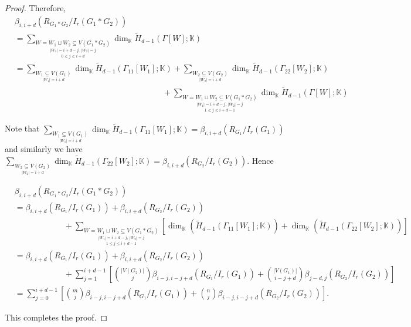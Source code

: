 \documentclass[10pt,a4paper]{amsart}
\newcommand{\K}{\mathbb K}
\begin{document}
\begin{proof}
\noindent
    Therefore,
    {\footnotesize
    \begin{align*}
       &\beta_{i,i+d}(R_{G_1*G_2}/I_r(G_1*G_2))\\
       &=\sum_{\underset{0\le j\le i+d}{\underset{|W_1|=i+d-j,\,|W_2|=j}{W=W_1\sqcup W_2 \subseteq V(G_1*G_2) }}} \dim_{\mathbb{K}} \widetilde{H}_{d-1}(\Gamma[W]; \mathbb{K})\\
       &=\sum_{\underset{|W_1|=i+d}{W_1 \subseteq V(G_1) }} \dim_{\mathbb{K}} \widetilde{H}_{d-1}(\Gamma_{11}[W_1]; \mathbb{K})+\sum_{\underset{|W_2|=i+d}{W_2 \subseteq V(G_2) }} \dim_{\mathbb{K}} \widetilde{H}_{d-1}(\Gamma_{22}[W_2]; \mathbb{K})\\
       &\hspace{18em}+\sum_{\underset{1\le j\le i+d-1}{\underset{|W_1|=i+d-j,\,|W_2|=j}{W=W_1\sqcup W_2 \subseteq V(G_1*G_2) }}} \dim_{\mathbb{K}} \widetilde{H}_{d-1}(\Gamma[W]; \mathbb{K})
       \end{align*}
       }

\noindent
Note that $\sum_{\underset{|W_1|=i+d}{W_1 \subseteq V(G_1) }} \dim_{\mathbb{K}} \widetilde{H}_{d-1}(\Gamma_{11}[W_1]; \mathbb{K})=\beta_{i,i+d}(R_{G_1}/I_r(G_1))$ and similarly we have $\sum_{\underset{|W_2|=i+d}{W_2 \subseteq V(G_2) }} \dim_{\mathbb{K}} \widetilde{H}_{d-1}(\Gamma_{22}[W_2]; \mathbb{K})=\beta_{i,i+d}(R_{G_2}/I_r(G_2))$. Hence

       {\footnotesize
       \begin{align*}
       &\beta_{i,i+d}(R_{G_1*G_2}/I_r(G_1*G_2))\\
       &=\beta_{i,i+d}(R_{G_1}/I_r(G_1))+\beta_{i,i+d}(R_{G_2}/I_r(G_2))\\
       &\hspace{6em}+\sum_{\underset{1\le j\le i+d-1}{\underset{|W_1|=i+d-j,\,|W_2|=j}{W=W_1\sqcup W_2 \subseteq V(G_1*G_2) }}}\left[\dim_{\K}(\widetilde H_{d-1}(\Gamma_{11}[W_1];\K))+\dim_{\K}(\widetilde H_{d-1}(\Gamma_{22}[W_2];\K))\right]\\
       &=\beta_{i,i+d}(R_{G_1}/I_r(G_1))+\beta_{i,i+d}(R_{G_2}/I_r(G_2))\\
       &\hspace{6em}+\sum_{j=1}^{i+d-1}\left[ {|V(G_2)|\choose j}\beta_{i-j,i-j+d}(R_{G_1}/I_r(G_1))+{|V(G_1)|\choose i-j+d}\beta_{j-d,j}(R_{G_2}/I_r(G_2)) \right]\\
       &=\sum_{j=0}^{i+d-1}\left[{m\choose j}\beta_{i-j,i-j+d}(R_{G_1}/I_r(G_1))+{n\choose j}\beta_{i-j,i-j+d}(R_{G_2}/I_r(G_2)) \right].
       \end{align*}}

       This completes the proof.
\end{proof}
\end{document}
